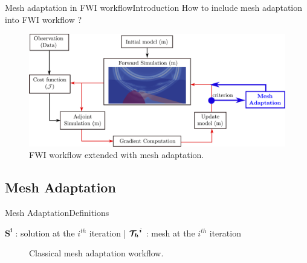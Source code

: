 \begin{frame}{Mesh adaptation in FWI workflow}{Introduction}
  How to include mesh adaptation into FWI workflow ?
\begin{figure}[!htbp]
\centering
\includegraphics[scale=0.2]{image/fwi_workflow_mesh_adapt.pdf}
\caption{FWI workflow extended with mesh adaptation.}
\label{fwi_workflow_mesh_extended}
\end{figure}
\end{frame}

\renewcommand{\footnotesize}{\fontsize{7pt}{9pt}\selectfont}
\subsection{Mesh Adaptation}
\begin{frame}{Mesh Adaptation}{Definitions}

  $\boldsymbol{S^i}$ : solution at the $i^{th}$ iteration |
  $\boldsymbol{{\mathcal{T}_h}^i}$ : mesh at the $i^{th}$ iteration

  \vspace{0.5cm}
   \begin{figure}
        \caption{Classical mesh adaptation workflow.}
   \end{figure}
\end{frame}

